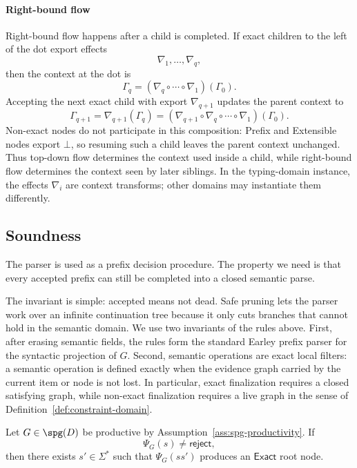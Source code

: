 \paragraph{Right-bound flow}

Right-bound flow happens after a child is completed. If exact children to the left of the dot export effects
\[
\nabla_1,\ldots,\nabla_q,
\]
then the context at the dot is
\[
\Gamma_q=(\nabla_q\circ\cdots\circ\nabla_1)(\Gamma_0).
\]
Accepting the next exact child with export $\nabla_{q+1}$ updates the parent context to
\[
\Gamma_{q+1}
=
\nabla_{q+1}(\Gamma_q)
=
(\nabla_{q+1}\circ\nabla_q\circ\cdots\circ\nabla_1)(\Gamma_0).
\]
Non-exact nodes do not participate in this composition: Prefix and Extensible nodes export $\bot$, so resuming such a child leaves the parent context unchanged. Thus top-down flow determines the context used inside a child, while right-bound flow determines the context seen by later siblings. In the typing-domain instance, the effects $\nabla_i$ are context transforms; other domains may instantiate them differently.

\subsection{Soundness}
\label{sec:parser-soundness}

The parser is used as a prefix decision procedure. The property we need is that every accepted prefix can still be completed into a closed semantic parse. 

The invariant is simple: accepted means not dead. Safe pruning lets the parser work over an infinite continuation tree because it only cuts branches that cannot hold in the semantic domain. We use two invariants of the rules above. First, after erasing semantic fields, the rules form the standard Earley prefix parser for the syntactic projection of $G$. Second, semantic operations are exact local filters: a semantic operation is defined exactly when the evidence graph carried by the current item or node is not lost. In particular, exact finalization requires a closed satisfying graph, while non-exact finalization requires a live graph in the sense of Definition~\ref{def:constraint-domain}.

\begin{theorem}
\label{thm:completability-soundness}
Let $G\in \spg(D)$ be productive by Assumption~\ref{ass:spg-productivity}. If
\[
  \Psi_G(s) \neq \mathsf{reject},
\]
then there exists $s' \in \Sigma^\ast$ such that $\Psi_G(ss')$ produces an $\mathsf{Exact}$ root node.
\end{theorem}

